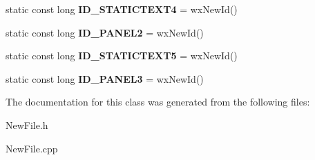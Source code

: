 \begin{DoxyCompactItemize}
\item 
\hypertarget{class_new_file_a709e0c5c241bb616a7b8a72f65cbe783}{static const long {\bfseries I\+D\+\_\+\+S\+T\+A\+T\+I\+C\+T\+E\+X\+T4} = wx\+New\+Id()}\label{class_new_file_a709e0c5c241bb616a7b8a72f65cbe783}

\item 
\hypertarget{class_new_file_aebe71a5c2402db2b186b4470bfb11017}{static const long {\bfseries I\+D\+\_\+\+P\+A\+N\+E\+L2} = wx\+New\+Id()}\label{class_new_file_aebe71a5c2402db2b186b4470bfb11017}

\item 
\hypertarget{class_new_file_afe43b64bf0068a3fa5bfb080671ec22e}{static const long {\bfseries I\+D\+\_\+\+S\+T\+A\+T\+I\+C\+T\+E\+X\+T5} = wx\+New\+Id()}\label{class_new_file_afe43b64bf0068a3fa5bfb080671ec22e}

\item 
\hypertarget{class_new_file_a200e4e0dd348ae126befc311f3228388}{static const long {\bfseries I\+D\+\_\+\+P\+A\+N\+E\+L3} = wx\+New\+Id()}\label{class_new_file_a200e4e0dd348ae126befc311f3228388}

\end{DoxyCompactItemize}


The documentation for this class was generated from the following files\+:\begin{DoxyCompactItemize}
\item 
New\+File.\+h\item 
New\+File.\+cpp\end{DoxyCompactItemize}
